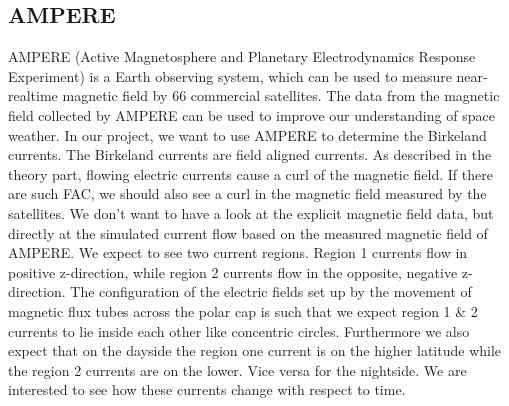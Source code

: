 \documentclass[10pt,a4paper]{article}
\begin{document}
\newpage
\subsection{AMPERE \label{0_CHAPTER_AMPERE}}
AMPERE (Active Magnetosphere and Planetary Electrodynamics Response Experiment) is a Earth observing system, which can be used to measure near-realtime magnetic field by 66 commercial satellites. The data from the magnetic field collected by AMPERE can be used to improve our understanding of space weather. In our project, we want to use AMPERE to determine the Birkeland currents. The Birkeland currents are field aligned currents. As described in the theory part, flowing electric currents 
cause a curl of the magnetic field. If there are such FAC, we should also see a curl in the magnetic field measured by the satellites.
We don't want to have a look at the explicit magnetic field data, but directly at the simulated current flow based on the measured magnetic field of AMPERE. We expect to 
see two current regions. Region 1 currents flow in positive z-direction, while region 2 currents flow in the opposite, negative z-direction. The configuration 
of the electric fields set up by the movement of magnetic flux tubes across the polar cap is such that we expect region 1 \& 2 currents to lie inside each other like concentric circles. Furthermore we also expect that on the dayside the region one current is on the higher latitude while the region 2 currents are on the lower. Vice versa for the nightside. We are interested to see how these currents change with respect to time.  
\end{document}
